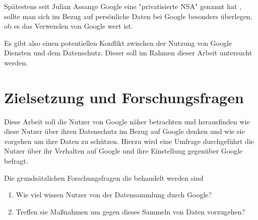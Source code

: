 Spätestens seit Julian Assange Google eine "privatisierte NSA" genannt hat \cite{assangegooglensa}, sollte man sich im Bezug auf persönliche Daten bei Google besonders überlegen, ob es das Verwenden von Google wert ist.

Es gibt also einen potentiellen Konflikt zwischen der Nutzung von Google Diensten und dem Datenschutz. Dieser soll im Rahmen dieser Arbeit untersucht werden.

\section{Zielsetzung und Forschungsfragen}
Diese Arbeit soll die Nutzer von Google näher betrachten und herausfinden wie diese Nutzer über ihren Datenschutz im Bezug auf Google denken und wie sie vorgehen um ihre Daten zu schützen. Hierzu wird eine Umfrage durchgeführt die Nutzer über ihr Verhalten auf Google und ihre Einstellung gegenüber Google befragt.

Die grundsätzlichen Forschungsfragen die behandelt werden sind
\begin{enumerate}
\item Wie viel wissen Nutzer von der Datensammlung durch Google?
\item Treffen sie Maßnahmen um gegen dieses Sammeln von Daten vorzugehen?
\end{enumerate}